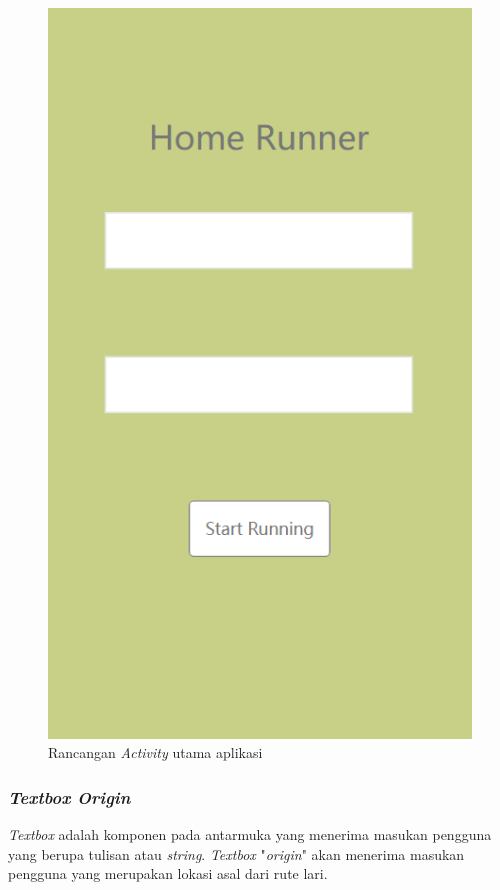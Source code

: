 \begin{figure}[!hp]
  \centering
    \includegraphics[scale=0.7]{Gambar/mockup-main-activity.png}
    \caption{Rancangan \textit{Activity} utama aplikasi}\label{fig:mockup-main-page}
\end{figure}


\subsubsection{\textit{Textbox Origin}} 
\textit{Textbox} adalah komponen pada antarmuka yang menerima masukan pengguna yang berupa tulisan atau \textit{string}. \textit{Textbox} "\textit{origin}" akan menerima masukan pengguna yang merupakan lokasi asal dari rute lari.

